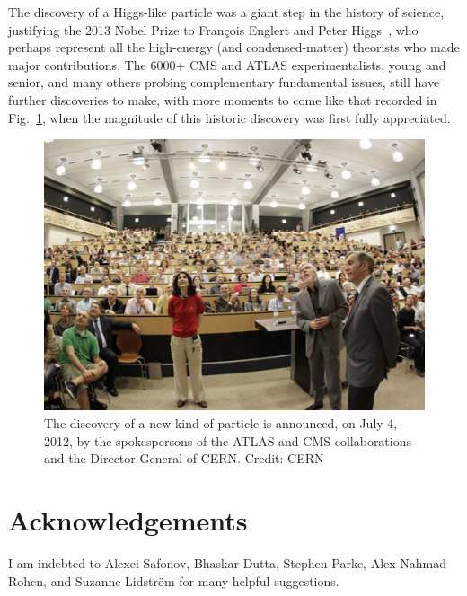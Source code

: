 \documentclass[12pt]{iopart}
\begin{document}
The discovery of a Higgs-like particle was a giant step in the history of science, justifying the 2013 Nobel Prize to Fran\c{c}ois Englert and Peter Higgs~\cite{press}, who perhaps represent all the high-energy (and condensed-matter) theorists who made major contributions. The 6000+ CMS and ATLAS experimentalists, young and senior, and many others probing complementary fundamental issues, still have further discoveries to make, with more moments to come like that recorded in Fig.~\ref{Fig24-discovery.eps}, when the magnitude of this historic discovery was first fully appreciated.
\begin{figure}[t]
\centering
\includegraphics[bb=0 0 360 300, width=5in]{Fig24-discovery.eps}
\caption{The discovery of a new kind of particle is announced, on July 4, 2012, by the spokespersons of the ATLAS and CMS collaborations and the Director General of CERN. Credit: CERN \label{Fig24-discovery.eps}}
\end{figure}

\section*{Acknowledgements}

I am indebted to Alexei Safonov, Bhaskar Dutta, Stephen Parke, Alex Nahmad-Rohen, and Suzanne Lidstr\"{o}m for many helpful suggestions.

\newpage
\end{document}
